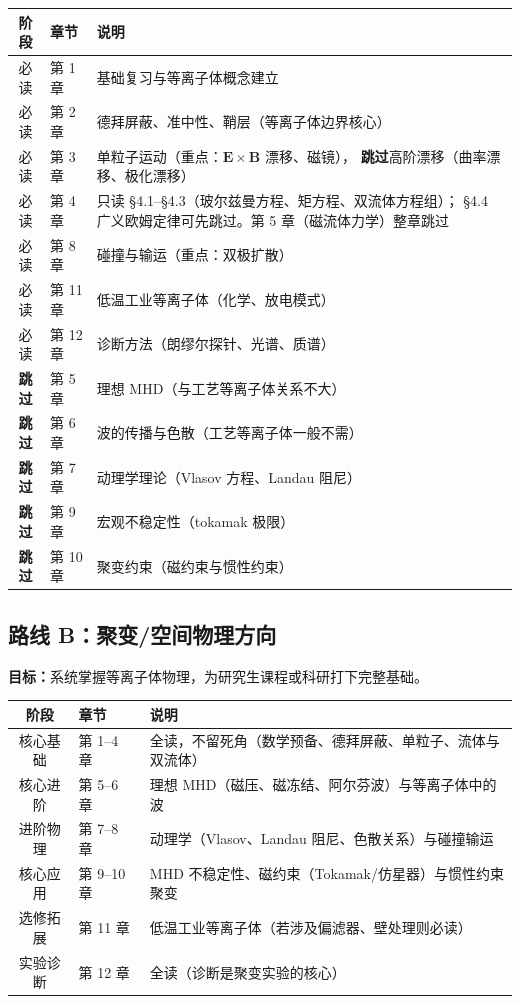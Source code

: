 \documentclass[12pt,a4paper,openany,oneside]{book}
\newcommand{\vect}[1]{\bm{#1}}
\begin{document}
\begin{table}[htbp]
\centering
\begin{tabular}{@{}clp{6cm}@{}}
\toprule
\textbf{阶段} & \textbf{章节} & \textbf{说明} \\
\midrule
必读 & 第 1 章 & 基础复习与等离子体概念建立 \\
必读 & 第 2 章 & 德拜屏蔽、准中性、鞘层（等离子体边界核心） \\
必读 & 第 3 章 & 单粒子运动（重点：$\vect{E}\times\vect{B}$ 漂移、磁镜），
\textbf{跳过}高阶漂移（曲率漂移、极化漂移） \\
必读 & 第 4 章 & 只读 \S 4.1--\S 4.3（玻尔兹曼方程、矩方程、双流体方程组）；
\S 4.4 广义欧姆定律可先跳过。第 5 章（磁流体力学）整章跳过 \\
必读 & 第 8 章 & 碰撞与输运（重点：双极扩散） \\
必读 & 第 11 章 & 低温工业等离子体（化学、放电模式） \\
必读 & 第 12 章 & 诊断方法（朗缪尔探针、光谱、质谱） \\
\midrule
\textbf{跳过} & 第 5 章 & 理想 MHD（与工艺等离子体关系不大） \\
\textbf{跳过} & 第 6 章 & 波的传播与色散（工艺等离子体一般不需） \\
\textbf{跳过} & 第 7 章 & 动理学理论（Vlasov 方程、Landau 阻尼） \\
\textbf{跳过} & 第 9 章 & 宏观不稳定性（tokamak 极限） \\
\textbf{跳过} & 第 10 章 & 聚变约束（磁约束与惯性约束） \\
\bottomrule
\end{tabular}
\end{table}


\subsection*{路线 B：聚变/空间物理方向}

\textbf{目标：}系统掌握等离子体物理，为研究生课程或科研打下完整基础。

\begin{table}[htbp]
\centering
\begin{tabular}{@{}clp{6cm}@{}}
\toprule
\textbf{阶段} & \textbf{章节} & \textbf{说明} \\
\midrule
核心基础 & 第 1--4 章 & 全读，不留死角（数学预备、德拜屏蔽、单粒子、流体与双流体） \\
核心进阶 & 第 5--6 章 & 理想 MHD（磁压、磁冻结、阿尔芬波）与等离子体中的波 \\
进阶物理 & 第 7--8 章 & 动理学（Vlasov、Landau 阻尼、色散关系）与碰撞输运 \\
核心应用 & 第 9--10 章 & MHD 不稳定性、磁约束（\mbox{Tokamak}/仿星器）与惯性约束聚变 \\
选修拓展 & 第 11 章 & 低温工业等离子体（若涉及偏滤器、壁处理则必读） \\
实验诊断 & 第 12 章 & 全读（诊断是聚变实验的核心） \\
\bottomrule
\end{tabular}
\end{table}
\end{document}
